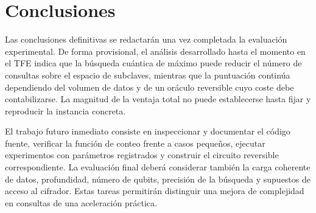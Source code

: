 \chapter{Conclusiones}

Las conclusiones definitivas se redactarán una vez completada la evaluación experimental. De forma provisional, el análisis desarrollado hasta el momento en el TFE indica que la búsqueda cuántica de máximo puede reducir el número de consultas sobre el espacio de subclaves, mientras que la puntuación continúa dependiendo del volumen de datos y de un oráculo reversible cuyo coste debe contabilizarse. La magnitud de la ventaja total no puede establecerse hasta fijar y reproducir la instancia concreta.

El trabajo futuro inmediato consiste en inspeccionar y documentar el código fuente, verificar la función de conteo frente a casos pequeños, ejecutar experimentos con parámetros registrados y construir el circuito reversible correspondiente. La evaluación final deberá considerar también la carga coherente de datos, profundidad, número de qubits, precisión de la búsqueda y supuestos de acceso al cifrador. Estas tareas permitirán distinguir una mejora de complejidad en consultas de una aceleración práctica.
